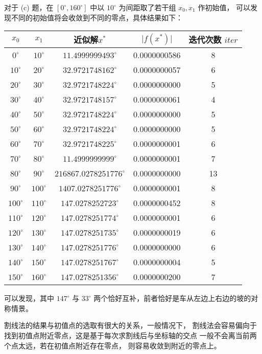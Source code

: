 \documentclass[lang=cn,a4paper,newtx,bibend=bibtex]{elegantpaper}
\begin{document}
对于 (c) 题，在 $[0^\circ, 160^\circ]$ 中以 $10^\circ$ 为间距取了若干组 $x_0,x_1$ 作初始值，
可以发现不同的初始值将会收敛到不同的零点，具体结果如下：

\begin{center}
  \begin{tabular}{|c|c|c|c|c|}
  \hline
  \textbf{$x_0$} & \textbf{$x_1$} & 近似解$x^*$ & $\vert f(x^*) \vert$ & 迭代次数 $iter$  \\
  \hline
  $0^\circ$ & $10^\circ$ & $11.4999999493^\circ$ & 0.0000000586 & 8 \\
  $10^\circ$ & $20^\circ$ & $32.9721748162^\circ$ & 0.0000000057 & 6 \\
  $20^\circ$ & $30^\circ$ & $32.9721748224^\circ$ & 0.0000000000 & 5 \\
  $30^\circ$ & $40^\circ$ & $32.9721748157^\circ$ & 0.0000000061 & 4 \\
  $40^\circ$ & $50^\circ$ & $32.9721748224^\circ$ & 0.0000000000 & 5 \\
  $50^\circ$ & $60^\circ$ & $32.9721748224^\circ$ & 0.0000000000 & 5 \\
  $60^\circ$ & $70^\circ$ & $32.9721748225^\circ$ & 0.0000000001 & 6 \\
  $70^\circ$ & $80^\circ$ & $11.4999999999^\circ$ & 0.0000000001 & 7 \\
  $80^\circ$ & $90^\circ$ & $216867.0278251776^\circ$ & 0.0000000000 & 13 \\
  $90^\circ$ & $100^\circ$ & $1407.0278251776^\circ$ & 0.0000000001 & 8 \\
  $100^\circ$ & $110^\circ$ & $147.0278252723^\circ$ & 0.0000000452 & 8 \\
  $110^\circ$ & $120^\circ$ & $147.0278251774^\circ$ & 0.0000000001 & 6 \\
  $120^\circ$ & $130^\circ$ & $147.0278251735^\circ$ & 0.0000000019 & 6 \\
  $130^\circ$ & $140^\circ$ & $147.0278251776^\circ$ & 0.0000000000 & 6 \\
  $140^\circ$ & $150^\circ$ & $147.0278251767^\circ$ & 0.0000000004 & 5 \\
  $150^\circ$ & $160^\circ$ & $147.0278251356^\circ$ & 0.0000000200 & 7 \\
  \hline
  \end{tabular}
  \end{center}

可以发现，其中 $147^\circ$ 与 $33^\circ$ 两个恰好互补，前者恰好是车从左边上右边的坡的对称情景。

割线法的结果与初值点的选取有很大的关系，一般情况下，
割线法会容易偏向于找到初值点附近零点，这是基于每次求割线后与坐标轴的交点
一般不会离当前两个点太远，若在初值点附近存在零点，
则容易收敛到附近的零点上。
\end{document}

